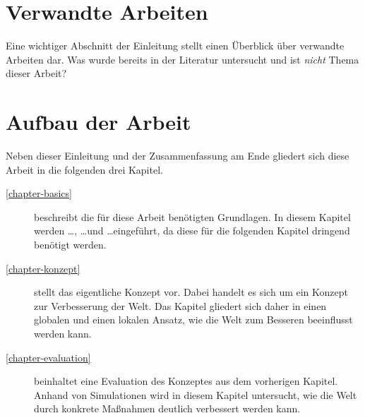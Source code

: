 \section{Verwandte Arbeiten}

Eine wichtiger Abschnitt der Einleitung stellt einen Überblick über verwandte Arbeiten dar. Was wurde bereits in der Literatur untersucht und ist \emph{nicht} Thema dieser Arbeit?

\section{Aufbau der Arbeit}

Neben dieser Einleitung und der Zusammenfassung am Ende gliedert sich diese Arbeit in die folgenden drei Kapitel.
\begin{description}
  \item[\ref{chapter-basics}] beschreibt die für diese Arbeit benötigten Grundlagen. In diesem Kapitel werden \ldots, \ldots und \ldots eingeführt, da diese für die folgenden Kapitel dringend benötigt werden.
  \item[\ref{chapter-konzept}] stellt das eigentliche Konzept vor. Dabei handelt es sich um ein Konzept zur Verbesserung der Welt. Das Kapitel gliedert sich daher in einen globalen und einen lokalen Ansatz, wie die Welt zum Besseren beeinflusst werden kann.
  \item[\ref{chapter-evaluation}] beinhaltet eine Evaluation des Konzeptes aus dem vorherigen Kapitel. Anhand von Simulationen wird in diesem Kapitel untersucht, wie die Welt durch konkrete Maßnahmen deutlich verbessert werden kann.
\end{description}


